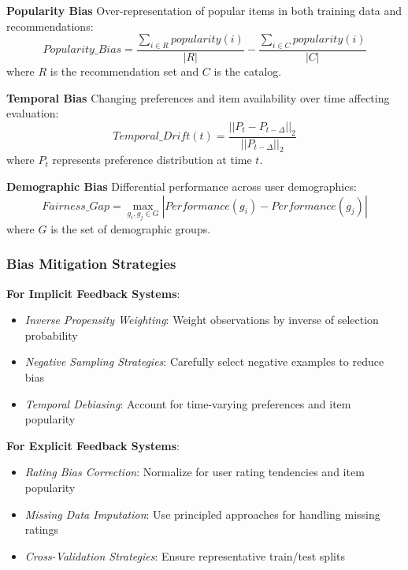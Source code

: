 \textbf{Popularity Bias}
Over-representation of popular items in both training data and recommendations:
\begin{equation}
Popularity\_Bias = \frac{\sum_{i \in R} popularity(i)}{|R|} - \frac{\sum_{i \in C} popularity(i)}{|C|}
\end{equation}
where $R$ is the recommendation set and $C$ is the catalog.

\textbf{Temporal Bias}
Changing preferences and item availability over time affecting evaluation:
\begin{equation}
Temporal\_Drift(t) = \frac{||P_t - P_{t-\Delta}||_2}{||P_{t-\Delta}||_2}
\end{equation}
where $P_t$ represents preference distribution at time $t$.

\textbf{Demographic Bias}
Differential performance across user demographics:
\begin{equation}
Fairness\_Gap = \max_{g_i, g_j \in G} |Performance(g_i) - Performance(g_j)|
\end{equation}
where $G$ is the set of demographic groups.

\subsubsection{Bias Mitigation Strategies}

\textbf{For Implicit Feedback Systems}:
\begin{itemize}
    \item \textit{Inverse Propensity Weighting}: Weight observations by inverse of selection probability
    \item \textit{Negative Sampling Strategies}: Carefully select negative examples to reduce bias
    \item \textit{Temporal Debiasing}: Account for time-varying preferences and item popularity
\end{itemize}

\textbf{For Explicit Feedback Systems}:
\begin{itemize}
    \item \textit{Rating Bias Correction}: Normalize for user rating tendencies and item popularity
    \item \textit{Missing Data Imputation}: Use principled approaches for handling missing ratings
    \item \textit{Cross-Validation Strategies}: Ensure representative train/test splits
\end{itemize}

